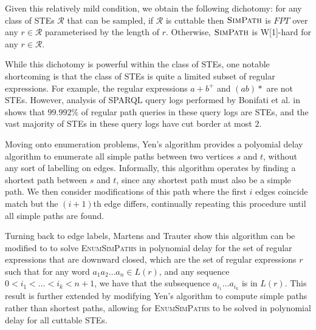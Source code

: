\documentclass{article}
\begin{document}
Given this relatively mild condition, we obtain the following dichotomy: for any class of STEs $\mathcal{R}$ that can be sampled, if $\mathcal{R}$ is cuttable then $\textsc{SimPath}$ is $FPT$ over any $r \in \mathcal{R}$ parameterised by the length of $r$. Otherwise, $\textsc{SimPath}$ is W[1]-hard for any $r \in \mathcal{R}$.

While this dichotomy is powerful within the class of STEs, one notable shortcoming is that the class of STEs is quite a limited subset of regular expressions. For example, the regular expressions $a + b^+$ and $(ab)*$ are not STEs. However, analysis of SPARQL query logs performed by Bonifati et al. in \cite{bonifatiAnalyticalStudyLarge2020} shows that $99.992\%$ of regular path queries in these query logs are STEs, and the vast majority of STEs in these query logs have cut border at most $2$.

Moving onto enumeration problems, Yen's algorithm \cite{yenFindingShortestLoopless1971} provides a polyomial delay algorithm to enumerate all simple paths between two vertices $s$ and $t$, without any sort of labelling on edges. Informally, this algorithm operates by finding a shortest path between $s$ and $t$, since any shortest path must also be a simple path. We then consider modifications of this path where the first $i$ edges coincide match but the $(i+1)$th edge differs, continually repeating this procedure until all simple paths are found.

Turning back to edge labels, Martens and Trauter show this algorithm can be modified to to solve \textsc{EnumSimPaths} in polynomial delay for the set of regular expressions that are downward closed, which are the set of regular expressions $r$ such that for any word $a_1 a_2 \dots a_n \in L(r)$, and any sequence $0 < i_1 < \dots < i_k < n + 1$, we have that the subsequence $a_{i_1} \dots a_{i_k}$ is in $L(r)$. This result is further extended by modifying Yen's algorithm to compute simple paths rather than shortest paths, allowing for \textsc{EnumSimPaths} to be solved in polynomial delay for all cuttable STEs.



\end{document}
